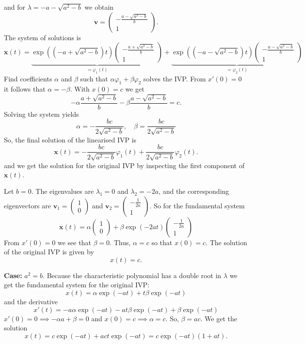 \documentclass[a4paper]{article}
\begin{document}
and for $\lambda = -a - \sqrt{a^2 - b}$ we obtain
\[
	\mathbf v = \begin{pmatrix}
		- \frac{a - \sqrt{a^2-b}}{b} \\ 1
	\end{pmatrix}.
\]
The system of solutions is
\[
	\mathbf x(t) =  \underbrace{\exp((-a + \sqrt{a^2 - b})t) \begin{pmatrix}
		- \frac{a + \sqrt{a^2-b}}{b} \\ 1
	\end{pmatrix}}_{=\varphi_1(t)} + \underbrace{\exp((-a - \sqrt{a^2 - b})t) \begin{pmatrix}
		- \frac{a - \sqrt{a^2-b}}{b} \\ 1
	\end{pmatrix}}_{= \varphi_2(t)}
\]
Find coefficients $\alpha$ and $\beta$ such that $\alpha \varphi_1 + \beta \varphi_2$ solves the IVP. From $x'(0) = 0$ it follows that $\alpha = -\beta$. With $x(0) = c$ we get
\[
	- \alpha \frac{a + \sqrt{a^2-b}}{b} - \beta \frac{a - \sqrt{a^2-b}}{b} = c.
\]
Solving the system yields
\[
	\alpha = - \frac{bc}{2 \sqrt{a^2-b}}, \quad \beta = \frac{bc}{2\sqrt{a^2-b}}
\]
So, the final solution of the linearised IVP is
\[
	\mathbf x(t) =  - \frac{bc}{2 \sqrt{a^2-b}} \varphi_1(t) + \frac{bc}{2\sqrt{a^2-b}} \varphi_2(t).
\]
and we get the solution for the original IVP by inspecting the first component of $\mathbf x(t)$.

Let $b = 0$. The eigenvalues are $\lambda_1 = 0$ and $\lambda_2 = -2a$, and the corresponding eigenvectors are $\mathbf v_1 = \begin{pmatrix}
	1 \\ 0
\end{pmatrix}$ and $\mathbf v_2 = \begin{pmatrix}
	-\frac{1}{2a} \\ 1
\end{pmatrix}$. So for the fundamental system
\[
	\mathbf x(t) =\alpha \begin{pmatrix}
	1 \\ 0
	\end{pmatrix} + \beta \exp(-2at) \begin{pmatrix}
		-\frac{1}{2a} \\ 1
	\end{pmatrix}
\]
From $x'(0) = 0$ we see that $\beta = 0$. Thus, $\alpha = c$ so that $x(0) = c$. The solution of the original IVP is given by
\[
	x(t) = c.
\]

\textbf{Case:} $a^2 = b$. Because the characteristic polynomial has a double root in $\lambda$ we get the fundamental system for the original IVP:
\[
	x(t) = \alpha  \exp(-at) + t \beta  \exp(-at)
\] 
and the derivative $$x'(t) = -a \alpha \exp(-at) -at\beta \exp(-at) + \beta \exp(-at)$$
$x'(0) = 0 \implies- \alpha a + \beta = 0$ and $x(0) = c \implies \alpha = c$. So, $\beta = ac$. We get the solution
\[
	x(t) = c \exp(-at) +act \exp(-at) = c \exp(-at)(1+at).
\]
\end{document}
